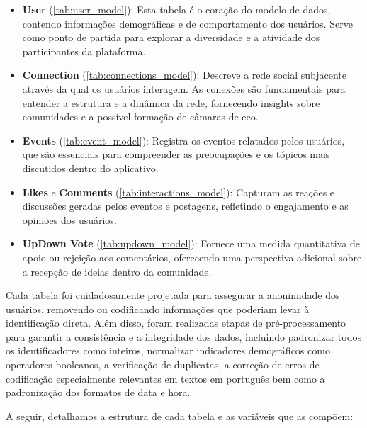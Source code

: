 \begin{itemize}
	\item \textbf{User} (\autoref{tab:user_model}): Esta tabela é o coração do modelo de dados, contendo informações demográficas e de comportamento dos usuários. Serve como ponto de partida para explorar a diversidade e a atividade dos participantes da plataforma.

	\item \textbf{Connection} (\autoref{tab:connections_model}): Descreve a rede social subjacente através da qual os usuários interagem. As conexões são fundamentais para entender a estrutura e a dinâmica da rede, fornecendo insights sobre comunidades e a possível formação de câmaras de eco.

	\item \textbf{Events} (\autoref{tab:event_model}): Registra os eventos relatados pelos usuários, que são essenciais para compreender as preocupações e os tópicos mais discutidos dentro do aplicativo.

	\item \textbf{Likes} e \textbf{Comments} (\autoref{tab:interactions_model}): Capturam as reações e discussões geradas pelos eventos e postagens, refletindo o engajamento e as opiniões dos usuários.

	\item \textbf{UpDown Vote} (\autoref{tab:updown_model}): Fornece uma medida quantitativa de apoio ou rejeição aos comentários, oferecendo uma perspectiva adicional sobre a recepção de ideias dentro da comunidade.
\end{itemize}

Cada tabela foi cuidadosamente projetada para assegurar a anonimidade dos usuários, removendo ou codificando informações que poderiam levar à identificação direta. Além disso, foram realizadas etapas de pré-processamento para garantir a consistência e a integridade dos dados, incluindo padronizar todos os identificadores como inteiros, normalizar indicadores demográficos como operadores booleanos, a verificação de duplicatas, a correção de erros de codificação especialmente relevantes em textos em português bem como a padronização dos formatos de data e hora.

A seguir, detalhamos a estrutura de cada tabela e as variáveis que as compõem:

